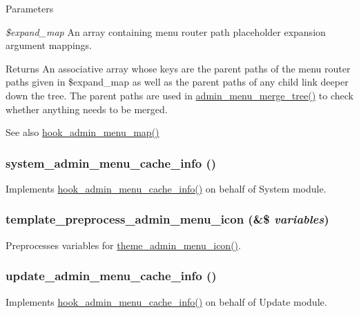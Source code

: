 \begin{DoxyParams}{Parameters}
\item[{\em \$expand\_\-map}]An array containing menu router path placeholder expansion argument mappings.\end{DoxyParams}
\begin{DoxyReturn}{Returns}
An associative array whose keys are the parent paths of the menu router paths given in \$expand\_\-map as well as the parent paths of any child link deeper down the tree. The parent paths are used in \hyperlink{admin__menu_8inc_a575d57ae5a9c1a4b8729ef022e17e019}{admin\_\-menu\_\-merge\_\-tree()} to check whether anything needs to be merged.
\end{DoxyReturn}
\begin{DoxySeeAlso}{See also}
\hyperlink{admin__menu_8api_8php_a4b3f2235db483f670a2e7327633868df}{hook\_\-admin\_\-menu\_\-map()} 
\end{DoxySeeAlso}
\hypertarget{admin__menu_8inc_addfcc1ff94f62409d4ff7fa7f523aa45}{
\subsubsection[{system\_\-admin\_\-menu\_\-cache\_\-info}]{\setlength{\rightskip}{0pt plus 5cm}system\_\-admin\_\-menu\_\-cache\_\-info ()}}
\label{admin__menu_8inc_addfcc1ff94f62409d4ff7fa7f523aa45}
Implements \hyperlink{admin__menu_8api_8php_a4458e9bb8dfc9515707b474b9faceca6}{hook\_\-admin\_\-menu\_\-cache\_\-info()} on behalf of System module. \hypertarget{admin__menu_8inc_af696ca093076e195d86786d7516ee9df}{
\subsubsection[{template\_\-preprocess\_\-admin\_\-menu\_\-icon}]{\setlength{\rightskip}{0pt plus 5cm}template\_\-preprocess\_\-admin\_\-menu\_\-icon (\&\$ {\em variables})}}
\label{admin__menu_8inc_af696ca093076e195d86786d7516ee9df}
Preprocesses variables for \hyperlink{group__themeable_gab93751624cbfa203208fba5c90192ee1}{theme\_\-admin\_\-menu\_\-icon()}. \hypertarget{admin__menu_8inc_a244f8c73c3414cbf1d9ec52f2fd65fbc}{
\subsubsection[{update\_\-admin\_\-menu\_\-cache\_\-info}]{\setlength{\rightskip}{0pt plus 5cm}update\_\-admin\_\-menu\_\-cache\_\-info ()}}
\label{admin__menu_8inc_a244f8c73c3414cbf1d9ec52f2fd65fbc}
Implements \hyperlink{admin__menu_8api_8php_a4458e9bb8dfc9515707b474b9faceca6}{hook\_\-admin\_\-menu\_\-cache\_\-info()} on behalf of Update module. 